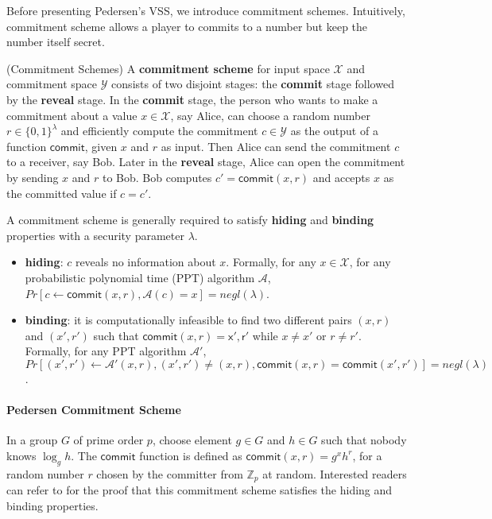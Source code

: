 Before presenting Pedersen's VSS, we introduce commitment schemes. Intuitively, commitment scheme allows a player to commits to a number but keep the number itself secret. 

\begin{definition} 
    (Commitment Schemes)
    A \textbf{commitment scheme} for input space $\mathcal{X}$ and commitment space $\mathcal{Y}$ consists of two disjoint stages: the \textbf{commit} stage followed by the \textbf{reveal} stage. In the \textbf{commit} stage, the person who wants to make a commitment about a value $x\in\mathcal{X}$, say Alice, can choose a random number $r\in\{0,1\}^\lambda$ and efficiently compute the commitment $c\in\mathcal{Y}$ as the output of a function $\mathsf{commit}$, given $x$ and $r$ as input. Then Alice can send the commitment $c$ to a receiver, say Bob. Later in the \textbf{reveal} stage, Alice can open the commitment by sending $x$ and $r$ to Bob. Bob computes $c'=\mathsf{commit}(x,r)$ and accepts $x$ as the committed value if $c=c'$. 
\end{definition}

A commitment scheme is generally required to satisfy \textbf{hiding} and \textbf{binding} properties with a security parameter $\lambda$. 

\begin{itemize}
    \item \textbf{hiding}: $c$ reveals no information about $x$. Formally, for any $x\in \mathcal{X}$, for any probabilistic polynomial time (PPT) algorithm $\mathcal{A}$, $Pr[c\leftarrow \mathsf{commit}(x, r), \mathcal{A}(c)=x]=negl(\lambda)$. 
    \item \textbf{binding}: it is computationally infeasible to find two different pairs $(x,r)$ and $(x', r')$ such that $\mathsf{commit}(x, r)=\mathsf{x', r'}$ while $x\neq x'$ or $r\neq r'$. Formally, for any PPT algorithm $\mathcal{A}'$, $Pr[(x', r')\leftarrow \mathcal{A}'(x, r), (x',r')\neq (x,r), \mathsf{commit}(x,r)=\mathsf{commit}(x',r')]=negl(\lambda)$. 
\end{itemize}

\paragraph{Pedersen Commitment Scheme} In a group $G$ of prime order $p$, choose element $g\in G$ and $h\in G$ such that nobody knows $\log_g h$. The $\mathsf{commit}$ function is defined as $\mathsf{commit}(x,r) = g^x h^r$, for a random number $r$ chosen by the committer from $\mathbb{Z}_p$ at random. Interested readers can refer to \cite{DBLP:conf/crypto/Pedersen91} for the proof that this commitment scheme satisfies the hiding and binding properties. 

